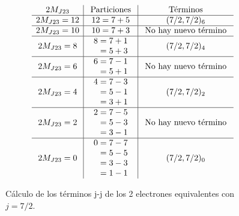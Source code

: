 \begin{figure}[H] 
  \begin{center}
  \begin{align*}
   \begin{array}{c | c | c}
     2M_{J23} & \text{ Particiones } & \text{ Términos }\\
     \hline 
     2M_{J23} = 12 & 12 = 7 + 5  & (7/2, 7/2)_{6} \\ 
     \hline 
      2M_{J23} = 10 & 10 = 7 + 3 & \text{ No hay nuevo término }\\ 
      \hline 
      2M_{J23} = 8 & \begin{aligned}
       8 &= 7 + 1\\
         &= 5 + 3
     \end{aligned} & (7/2, 7/2)_{4} \\
     \hline 
      2M_{J23} = 6 & \begin{aligned}
        6 &= 7 - 1\\
          &= 5 + 1\\
          \end{aligned} & \text{ No hay nuevo término }\\ 
          \hline
      2M_{J23} = 4 & \begin{aligned}
        4 &= 7 - 3\\
          &= 5 - 1\\
          &= 3 + 1
          \end{aligned}
       & (7/2, 7/2)_{2} \\
      \hline 
      2M_{J23} = 2 & \begin{aligned}
        2 &= 7 - 5\\ 
          &= 5 - 3\\
          &= 3 - 1\\ 
          \end{aligned} & \text{ No hay nuevo término }\\
          \hline 
      2M_{J23} = 0 & \begin{aligned}
        0 &= 7 - 7\\
          &= 5 - 5\\
          &= 3 - 3\\
          &= 1 - 1
      \end{aligned} & (7/2, 7/2)_{0}
   \end{array}
  \end{align*}
  \end{center}
  \caption{Cálculo de los términos j-j de los 2 electrones equivalentes con $j = 7/2$.}\label{fig: calculo de los terminos j-j de los 2 electrones equivalentes con j = 7/2}
\end{figure}
